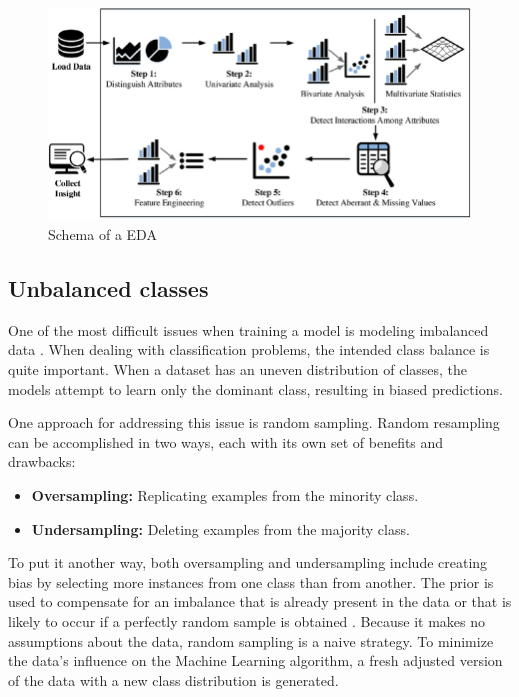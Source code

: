 \begin{figure}[H]
\centering
\includegraphics[scale=0.4]{img/EDAschema.PNG}
\caption{Schema of a EDA}
\label{fig:eda}
\end{figure}

\subsection{Unbalanced classes} \label{3unbclass}

One of the most difficult issues when training a model is modeling imbalanced data \cite{smote1}. When dealing with classification problems, the intended class balance is quite important. When a dataset has an uneven distribution of classes, the models attempt to learn only the dominant class, resulting in biased predictions.

One approach for addressing this issue is random sampling. Random resampling can be accomplished in two ways, each with its own set of benefits and drawbacks:

\begin{itemize}
    \item \textbf{Oversampling:} Replicating examples from the minority class.
    \item \textbf{Undersampling:} Deleting examples from the majority class.
\end{itemize}

To put it another way, both oversampling and undersampling include creating bias by selecting more instances from one class than from another. The prior is used to compensate for an imbalance that is already present in the data or that is likely to occur if a perfectly random sample is obtained \cite{smote2}. Because it makes no assumptions about the data, random sampling is a naive strategy. To minimize the data's influence on the Machine Learning algorithm, a fresh adjusted version of the data with a new class distribution is generated.


